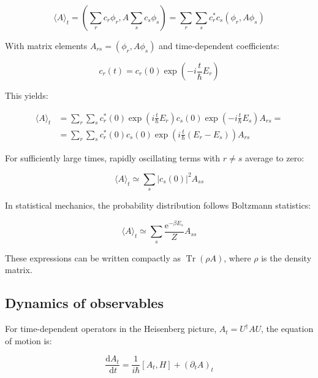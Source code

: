 \documentclass[italian]{HKNdocument}
\begin{document}
\begin{equation}
\langle A\rangle_{t}=\left(\sum_{r} c_{r} \phi_{r}, A \sum_{s} c_{s} \phi_{s}\right)=\sum_{r} \sum_{s} c_{r}^{*} c_{s}\left(\phi_{r}, A \phi_{s}\right)
\end{equation}

With matrix elements $A_{rs} = (\phi_r, A\phi_s)$ and time-dependent coefficients:

\begin{equation}
c_{r}(t)=c_{r}(0) \exp \left(-i \frac{t}{\hbar} E_{r}\right)
\end{equation}

This yields:

\begin{align}
\langle A\rangle_{t} & =\sum_{r} \sum_{s} c_{r}^{*}(0) \exp \left(i \frac{t}{\hbar} E_{r}\right) c_{s}(0) \exp \left(-i \frac{t}{\hbar} E_{s}\right) A_{r s}= \\
& =\sum_{r} \sum_{s} c_{r}^{*}(0) c_{s}(0) \exp \left(i \frac{t}{\hbar}\left(E_{r}-E_{s}\right)\right) A_{r s}
\end{align}

For sufficiently large times, rapidly oscillating terms with $r \neq s$ average to zero:

\begin{equation}
\langle A\rangle_{t} \simeq \sum_{s}\left|c_{s}(0)\right|^{2} A_{s s}
\end{equation}

In statistical mechanics, the probability distribution follows Boltzmann statistics:

\begin{equation}
\langle A\rangle_{t} \simeq \sum_{s} \frac{\mathrm{e}^{-\beta E_{s}}}{Z} A_{s s}
\end{equation}

These expressions can be written compactly as $\operatorname{Tr}(\rho A)$, where $\rho$ is the density matrix.

\subsection{Dynamics of observables}
For time-dependent operators in the Heisenberg picture, $A_t = U^\dagger A U$, the equation of motion is:

\begin{equation}
\frac{\mathrm{d} A_{t}}{\, \mathrm{d} t}=\frac{1}{i \hbar}\left[A_{t}, H\right]+\left(\partial_{t} A\right)_{t}
\end{equation}
\end{document}
